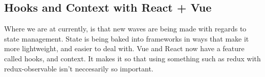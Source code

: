 \subsection{ Hooks and Context with React + Vue }
Where we are at currently, is that new waves are being made with regards to
state management. State is being baked into frameworks in ways that make it
more lightweight, and easier to deal with. Vue and React now have a feature
called hooks, and context. It makes it so that using something such as redux
with redux-observable isn't neccesarily so important.
